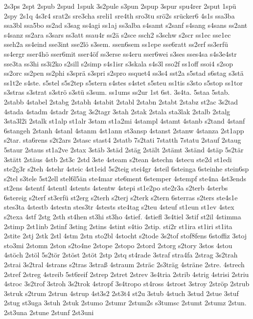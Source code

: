 {2s3ps
2spt
2spub
2spud
1spuk
3s2pule
s3pun
2spup
3spur
spu4rer
2sput
1spü
2spy
2s1q
4s3r4
srat2s
sre3cha
sreli1
sre4th
sro3tu
srö2s
srücker6
4s1s
ssa3ba
ssa3bl
ssa5bo
ss2ad
s3sag
ss4agi
ss1aj
ss3alba
s4samt
s2sanf
s4sang
s4sans
ss2ant
s4sanz
ss2ara
s3sars
ss3att
ssau4r
ss2ä
s2sce
ssch2
s3schw
s2scr
ss1ec
sse1ec
sseh2a
ss4eind
sse3int
sse2lö
s3sem.
ssen6sem
ss1epe
sse6ratt
ss2erf
ss3erfü
ss4ergr
sser4hö
sser6mit
sser4öf
ss3erse
ss4eru
sser6wei
s3ses
sses4sa
s4s3e4str
sse3ta
ss3hi
ss3i2ko
s2sill
s2simp
s4s1isr
s3skala
s4s3l
sso2f
ss1off
ssoi4
s2sop
ss2orc
ss2pen
ss2phi
s3sprä
s3spri
s2spro
ssquet4
ss3s4
sst2a
s5stad
s6stag
s3stä
ss1t2e
s4ste.
s5stel
s5s2tep
s5stern
s4stes
s4stet
s5steu
ss1tis
s3sto
s5stop
ss1tor
s3stras
s3strat
s3strö
s3stü
s3sum.
ss1ums
ss2ur
1st
6st.
3s4ta.
5staa
5stab.
2stabb
4stabel
2stabg
2stabh
4stabit
2stabl
2stabn
2stabt
2stabz
st2ac
3s2tad
4stada
4stadm
4stadr
2stag
3s2tagr
3stah
2stak
2stala
sta3lak
2stalb
2stalg
3sta3l2i
2stalk
st1alp
st1alr
3stam
st1a2mi
4stampl
4stamt
4stanb
s2tand
4stanf
6stangeh
2stanh
4stanl
4stanm
4st1ann
st3ansp
4stanst
2stanw
4stanza
2st1app
s2tar.
sta6rens
s2t2ars
2stasc
stast4
2statb
7s2tati
7statth
7statu
2stauf
2staug
5staur
2staus
st1a2ve
2stax
3stäb
3städ
2stäg
2stält
2stämt
3ständ
4stäp
5s2tär
3stätt
2stäus
4stb
2st3c
2std
3ste
4steam
s2tean
4stechn
4stecu
ste2d
st1edi
ste2g3r
s2teh
4stehr
4steic
4st1eid
5s2teig
stei4gr
4steil
6steinga
6steinhe
stein6sp
s2tel
s3tele
5st2ell
stel6l5än
ste4mar
ste6ment
6stemper
4stempf
ste4na
4st3ends
st2ens
4stentf
4stentl
4stents
4stentw
4stepi
st1e2po
ste2r3a
s2terb
4sterbs
6stereig
s2terf
st3erfü
st2erg
s2terh
s2terj
s2terk
s2tern
6sterras
s2ters
ste4s1e
stes3ta
4stestb
4stestn
stes3tr
4stests
ste4tag
s2teu
4steuf
st1eun
st1ev
4stex
s2texa
4stf
2stg
2sth
st4hen
st3hi
st3ho
4stief.
4stiefl
3s4tiel
3stif
st2il
4stimma
2stimp
2st1inb
2stinf
3sting
2stins
4stint
s4tio
2stip.
sti2r
st1ira
st1iri
st1ita
2stite
2stj
2stk
2stl
4stm
2stn
sto2bl
4stocht
s2tode
3s2tof
stof8fens
6stoffiz
3stoj
sto3mi
2stomn
2ston
s2to4ne
2stope
2stopo
2stord
2storg
s2tory
3stos
4stou
4stöch
2stöl
5s2tör
2stöst
2stöt
2stp
2stq
st4rade
3straf
stra4fa
2strag
3s2trah
2strai
3s2tral
4strans
s2tras
3straß
4straum
2sträc
2s3träg
4sträne
2stre.
4strech
2stref
2streg
4streib
5st6reif
2strep
2stret
2strev
3s4tria
2strib
4strig
4strisi
2striu
4stroc
3s2trof
3stroh
3s2trok
4stropf
3s4tropo
st4ross
4strost
3stroy
2ströp
2strub
3struk
s2trum
2strun
4strup
4st3s2
2st3t4
st2u
3stub
4stuch
3stud
2stue
3stuf
2stug
st3uga
3stuh
2stuk
2stumo
2stumr
2stum2s
s3tumsc
2stumt
2stumz
2stun.
2st3una
2stune
2stunf
2st3uni
}
